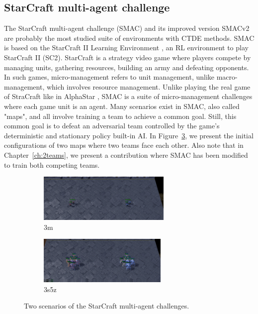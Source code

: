 \subsection{StarCraft multi-agent challenge} \label{sec:ch3_smac}
The StarCraft multi-agent challenge (SMAC) \citep{samvelyan2019starcraft} and its improved version SMACv2 \citep{ellis2023smacv2} are probably the most studied suite of environments with CTDE methods.
SMAC is based on the StarCraft II Learning Environment \citep{vinyals2017starcraft}, an RL environment to play StarCraft II (SC2).
StarCraft is a strategy video game where players compete by managing units, gathering resources, building an army and defeating opponents.
In such games, micro-management refers to unit management, unlike macro-management, which involves resource management.
Unlike playing the real game of StraCraft like in AlphaStar \citep{vinyals2019grandmaster}, SMAC is a suite of micro-management challenges where each game unit is an agent.
Many scenarios exist in SMAC, also called "maps", and all involve training a team to achieve a common goal.
Still, this common goal is to defeat an adversarial team controlled by the game's deterministic and stationary policy built-in AI.
In Figure~\ref{fig:ch3_smac}, we present the initial configurations of two maps where two teams face each other.
Also note that in Chapter~\ref{ch:2teams}, we present a contribution where SMAC has been modified to train both competing teams.

\begin{figure}
     \centering
     \begin{subfigure}[b]{0.5\textwidth}
         \centering
         \includegraphics[height=2.3cm]{tex_thesis/figures/ch3/3m_screen.pdf}
         \caption{3m}
         \label{fig:ch3_3m}
     \end{subfigure}%
     \begin{subfigure}[b]{0.5\textwidth}
         \centering
         \includegraphics[height=2.3cm]{tex_thesis/figures/ch3/3s5z_screen.pdf}
         \caption{3s5z}
         \label{fig:ch3_3s5z}
     \end{subfigure}
    \caption{Two scenarios of the StarCraft multi-agent challenges.}
    \label{fig:ch3_smac}
\end{figure}

